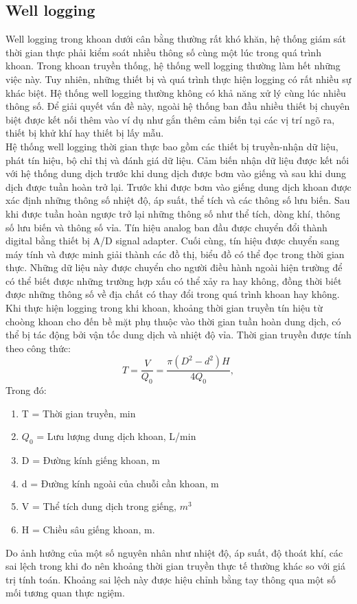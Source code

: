 \documentclass[12pt,a4paper]{article}
\begin{document}
\subsection{Well logging}
	Well logging\cite{wu2017research} trong khoan dưới cân bằng thường rất khó khăn, hệ thống giám sát thời gian thực phải kiểm soát nhiều thông số cùng một lúc trong quá trình khoan. Trong khoan truyền thống, hệ thống well logging thường làm hết những việc này. Tuy nhiên, những thiết bị và quá trình thực hiện logging có rất nhiều sự khác biệt. Hệ thống well logging thường không có khả năng xử lý cùng lúc nhiều thông số. Để giải quyết vấn đề này, ngoài hệ thống ban đầu nhiều thiết bị chuyên biệt được kết nối thêm vào ví dụ như gắn thêm cảm biến tại các vị trí ngõ ra, thiết bị khử khí hay thiết bị lấy mẫu. \\
	Hệ thống well logging thời gian thực bao gồm các thiết bị truyền-nhận dữ liệu, phát tín hiệu, bộ chỉ thị và đánh giá dữ liệu. Cảm biến nhận dữ liệu được kết nối với hệ thống dung dịch trước khi dung dịch được bơm vào giếng và sau khi dung dịch được tuần hoàn trở lại. Trước khi được bơm vào giếng dung dịch khoan được xác định những thông số nhiệt độ, áp suất, thể tích và các thông số lưu biến. Sau khi được tuần hoàn ngược trở lại những thông số như thể tích, dòng khí, thông số lưu biến và thông số vỉa. Tín hiệu analog ban đầu được chuyển đổi thành digital bằng thiết bị A/D signal adapter. Cuối cùng, tín hiệu được chuyển sang máy tính và được minh giải thành các đồ thị, biểu đồ có thể đọc trong thời gian thực. Những dữ liệu này được chuyển cho người điều hành ngoài hiện trường để có thể biết được những trường hợp xấu có thể xảy ra hay không, đồng thời biết được những thông số về địa chất có thay đổi trong quá trình khoan hay không. \\
	Khi thực hiện logging trong khi khoan, khoảng thời gian truyền tín hiệu từ choòng khoan cho đến bề mặt phụ thuộc vào thời gian tuần hoàn dung dịch, có thể bị tác động bởi vận tốc dung dịch và nhiệt độ vỉa. Thời gian truyền được tính theo công thức\cite{wu2017research}:
	\newpage
	\begin{equation}
		T = \frac{V}{Q_0} = \frac{\pi (D^2 - d^2)H}{4Q_0},
	\end{equation}
	Trong đó:
	\begin{enumerate}
		\item[] T = Thời gian truyền, min 
		\item[] $Q_0$ = Lưu lượng dung dịch khoan, L/min 
		\item[] D = Đường kính giếng khoan, m
		\item[] d = Đường kính ngoài của chuỗi cần khoan, m
		\item[] V = Thể tích dung dịch trong giếng, $m^3$
		\item[] H = Chiều sâu giếng khoan, m.
	\end{enumerate}
	Do ảnh hưởng của một số nguyên nhân như nhiệt độ, áp suất, độ thoát khí, các sai lệch trong khi đo nên khoảng thời gian truyền thực tế thường khác so với giá trị tính toán. Khoảng sai lệch này được hiệu chỉnh bằng tay thông qua một số mối tương quan thực ngiệm.
\end{document}
